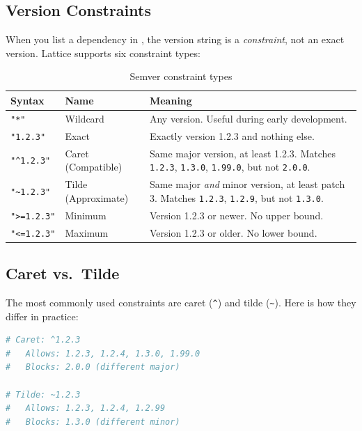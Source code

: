 \subsection{Version Constraints}\label{subsec:version-constraints}

When you list a dependency in , the version string is a \emph{constraint}, not an exact version.
Lattice supports six constraint types:

\begin{table}[h]
\centering
\caption{Semver constraint types}\label{tab:semver-constraints}
\begin{tabular}{@{}llp{7cm}@{}}
\toprule
\textbf{Syntax} & \textbf{Name} & \textbf{Meaning} \\
\midrule
\texttt{"*"}       & Wildcard & Any version. Useful during early development. \\
\texttt{"1.2.3"}   & Exact    & Exactly version 1.2.3 and nothing else. \\
\texttt{"\^{}1.2.3"} & Caret (Compatible) & Same major version, at least 1.2.3. Matches \texttt{1.2.3}, \texttt{1.3.0}, \texttt{1.99.0}, but not \texttt{2.0.0}. \\
\texttt{"\~{}1.2.3"} & Tilde (Approximate) & Same major \emph{and} minor version, at least patch 3. Matches \texttt{1.2.3}, \texttt{1.2.9}, but not \texttt{1.3.0}. \\
\texttt{">=1.2.3"} & Minimum  & Version 1.2.3 or newer. No upper bound. \\
\texttt{"<=1.2.3"} & Maximum  & Version 1.2.3 or older. No lower bound. \\
\bottomrule
\end{tabular}
\end{table}

\subsection{Caret vs.\ Tilde}\label{subsec:caret-vs-tilde}

The most commonly used constraints are caret (\texttt{\^{}}) and tilde (\texttt{\~{}}).
Here is how they differ in practice:

\begin{lstlisting}[language=bash, numbers=none, caption={Caret vs.\ tilde constraints}]
# Caret: ^1.2.3
#   Allows: 1.2.3, 1.2.4, 1.3.0, 1.99.0
#   Blocks: 2.0.0 (different major)

# Tilde: ~1.2.3
#   Allows: 1.2.3, 1.2.4, 1.2.99
#   Blocks: 1.3.0 (different minor)
\end{lstlisting}

